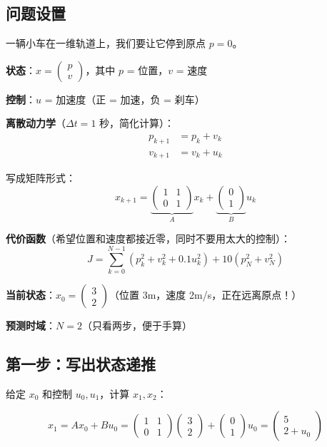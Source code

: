 \subsection{问题设置}

一辆小车在一维轨道上，我们要让它停到原点 $p = 0$。

\textbf{状态}：$x = \begin{pmatrix} p \\ v \end{pmatrix}$，其中 $p$ = 位置，$v$ = 速度

\textbf{控制}：$u$ = 加速度（正 = 加速，负 = 刹车）

\textbf{离散动力学}（$\Delta t = 1$ 秒，简化计算）：
\begin{align}
p_{k+1} &= p_k + v_k \\
v_{k+1} &= v_k + u_k
\end{align}

写成矩阵形式：
\[
x_{k+1} = \underbrace{\begin{pmatrix} 1 & 1 \\ 0 & 1 \end{pmatrix}}_{A} x_k + \underbrace{\begin{pmatrix} 0 \\ 1 \end{pmatrix}}_{B} u_k
\]

\textbf{代价函数}（希望位置和速度都接近零，同时不要用太大的控制）：
\[
J = \sum_{k=0}^{N-1} (p_k^2 + v_k^2 + 0.1 u_k^2) + 10(p_N^2 + v_N^2)
\]

\textbf{当前状态}：$x_0 = \begin{pmatrix} 3 \\ 2 \end{pmatrix}$（位置 3m，速度 2m/s，正在远离原点！）

\textbf{预测时域}：$N = 2$（只看两步，便于手算）

\subsection{第一步：写出状态递推}

给定 $x_0$ 和控制 $u_0, u_1$，计算 $x_1, x_2$：

\[
x_1 = A x_0 + B u_0 = \begin{pmatrix} 1 & 1 \\ 0 & 1 \end{pmatrix} \begin{pmatrix} 3 \\ 2 \end{pmatrix} + \begin{pmatrix} 0 \\ 1 \end{pmatrix} u_0 = \begin{pmatrix} 5 \\ 2 + u_0 \end{pmatrix}
\]

